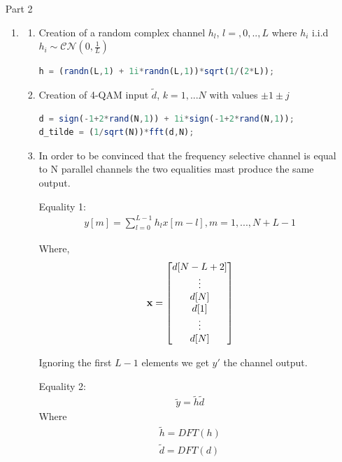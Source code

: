 \documentclass[12pt]{article}
\begin{document}
\begin{enumerate}
		\item[Part 2]
		\begin{enumerate}
			\item 
				\begin{enumerate}
					\item Creation of a random complex channel $h_l$, $l=,0,..,L$ where $h_i$ i.i.d $h_i \sim \mathcal{CN}(0,\frac{1}{L})$
					\begin{lstlisting}[language=octave]
% Channel response
h = (randn(L,1) + 1i*randn(L,1))*sqrt(1/(2*L));
					\end{lstlisting}
				
					\item Creation of 4-QAM input $\tilde{d}$, $k=1,...N$ with values $\pm 1 \pm j$
					
					\begin{lstlisting}[language=octave]
% 4-QAM data block
d = sign(-1+2*rand(N,1)) + 1i*sign(-1+2*rand(N,1));
d_tilde = (1/sqrt(N))*fft(d,N);
					\end{lstlisting}
				
					\item In order to be convinced that the frequency selective channel is equal to N parallel channels the two equalities mast produce the same output.
					
					Equality 1:
					\begin{align*}
						y[m] = \sum_{l=0}^{L-1}h_lx[m-l], m=1,...,N+L-1
					\end{align*} 
					
					Where,
					\begin{align*}
						{\bf x} = \begin{bmatrix}
							d[N-L+2] \\ \vdots \\ d[N] \\ d[1] \\ \vdots \\ d[N]
						\end{bmatrix}
					\end{align*}
				
					Ignoring the first $L-1$ elements we get $y'$ the channel output.
					
					Equality 2:
					\begin{align*}
						\tilde{y} = \tilde{h}\tilde{d}
					\end{align*}
					Where 
					\begin{align*}
						\tilde{h} = DFT(h)\\
						\tilde{d} = DFT(d)
					\end{align*}
				

\end{enumerate}
\end{enumerate}
\end{enumerate}
\end{document}
